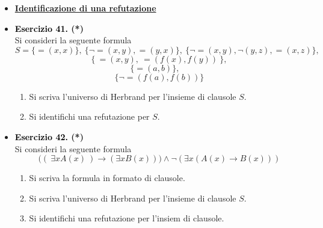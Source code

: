 \documentclass[a4paper,10pt]{article}
\begin{document}
    {\normalsize
    \begin{itemize}[label=, leftmargin=0pt]
    

    
    

    \item \textbf{\underline{Identificazione di una refutazione}}


    \item \textbf{\textcolor{black}{Esercizio 41.} (*)} \\ 	
    Si consideri la seguente formula 
    $$S=\{=(x,x)\},\ \{\lnot=(x,y),=(y,x)\},\ \{\lnot =(x,y), \lnot(y,z),=(x,z)\},\ $$
    $$\{\ =(x,y),\ =(f(x),f(y))\ \},$$
    $$\{=(a,b)\},\quad $$ $$\{\lnot =(f(a),f(b))\}$$
    
    \begin{enumerate}
        \item Si scriva l'universo di Herbrand per l'insieme di clausole $S$.
        \item Si identifichi una refutazione per $S$.
    \end{enumerate}

    \item \textbf{\textcolor{black}{Esercizio 42.} (*)} \\ 	
    Si consideri la seguente formula 
    $$\bigg((\ \exists x A(x)\ ) \rightarrow (\exists x B(x)) \bigg) \land \lnot (\exists x (A(x) \rightarrow B(x)))$$
    
    \begin{enumerate}
        \item Si scriva la formula in formato di clausole.
        \item Si scriva l'universo di Herbrand per l'insieme di clausole $S$.
        \item Si identifichi una refutazione per l'insiem di clausole.
    \end{enumerate}


\end{itemize}}
\end{document}
